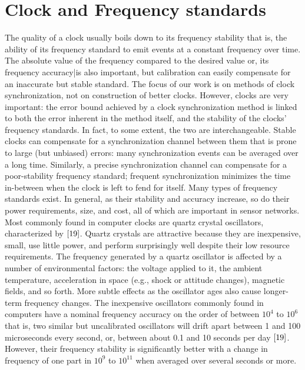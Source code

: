\documentclass[a4paper,8pt]{report}
\begin{document}
\section{Clock and Frequency standards}
The quality of a clock usually boils down to its frequency stability
that is, the ability of its frequency standard to emit events at a
constant frequency over time. The absolute value of the frequency
compared to the desired value or, its frequency accuracy|is also
important, but calibration can easily compensate for an inaccurate
but stable standard.
\newline The focus of our work is on methods of clock synchronization,
not on construction of better clocks. However, clocks are very
important: the error bound achieved by a clock synchronization
method is linked to both the error inherent in the method itself,
and the stability of the clocks' frequency standards. In fact, to
some extent, the two are interchangeable. Stable clocks can
compensate for a synchronization channel between them that is prone
to large (but unbiased) errors: many synchronization events can be
averaged over a long time. Similarly, a precise synchronization
channel can compensate for a poor-stability frequency standard;
frequent synchronization minimizes the time in-between when the
clock is left to fend for itself.
\newline
Many types of frequency standards exist. In general, as their
stability and accuracy increase, so do their power requirements,
size, and cost, all of which are important in sensor networks. Most
commonly found in computer clocks are quartz crystal oscillators,
characterized by $\cite{19}$. Quartz crystals are attractive because
they are inexpensive, small, use little power, and perform
surprisingly well despite their low resource requirements. The
frequency generated by a quartz oscillator is affected by a number
of environmental factors: the voltage applied to it, the ambient
temperature, acceleration in space (e.g., shock or attitude
changes), magnetic fields, and so forth. More subtle effects as the
oscillator ages also cause longer-term frequency changes. The
inexpensive oscillators commonly found in computers have a nominal
frequency accuracy on the order of between $10^4$ to $10^6$ that is,
two similar but uncalibrated oscillators will drift apart between 1
and 100 microseconds every second, or, between about 0.1 and 10
seconds per day $\cite{19}$. However, their frequency stability is
significantly better with a change in frequency of one part in
$10^9$ to $10^11$ when averaged over several seconds or more.
\newpage
\end{document}
